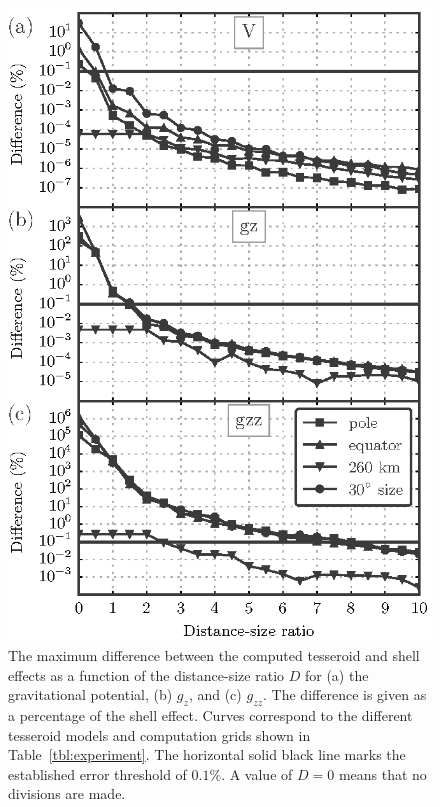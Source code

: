 \documentclass[manuscript,endfloat]{geophysics}
\begin{document}
\begin{figure}
    \centering
    \includegraphics{figs/distance-size-curves}
    \caption{
        The maximum difference between the computed tesseroid and shell effects
        as a function of the distance-size ratio $D$
        for (a) the gravitational potential, (b) $g_z$, and (c) $g_{zz}$.
        The difference is given as a percentage of the shell effect.
        Curves correspond to the different tesseroid models and computation
        grids shown in Table~\ref{tbl:experiment}.
        The horizontal solid black line marks the established error threshold
        of $0.1\%$.
        A value of $D=0$ means that no divisions are made.
    }
    \label{fig:dist-size-curves}
\end{figure}
\end{document}
